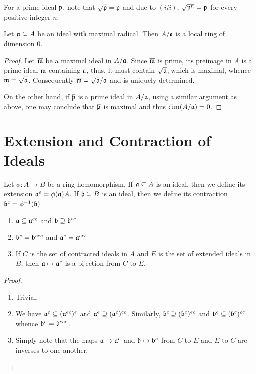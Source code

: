 For a prime ideal $\mathfrak p$, note that $\sqrt{\mathfrak p} = \mathfrak p$ and due to $(iii)$, $\sqrt{\mathfrak p^n} = \mathfrak p$ for every positive integer $n$. 

\begin{proposition}
    Let $\mathfrak a\subseteq A$ be an ideal with maximal radical. Then $A/\mathfrak a$ is a local ring of dimension $0$.
\end{proposition}
\begin{proof}
    Let $\overline{\mathfrak m}$ be a maximal ideal in $A/\mathfrak a$. Since $\overline{\mathfrak m}$ is prime, its preimage in $A$ is a prime ideal $\mathfrak m$ containing $\mathfrak a$, thus, it must contain $\sqrt{\mathfrak a}$, which is maximal, whence $\mathfrak m = \sqrt{\mathfrak a}$. Consequently $\overline{\mathfrak m} = \sqrt{\mathfrak a}/\mathfrak a$ and is uniquely determined.

    On the other hand, if $\overline{\mathfrak p}$ is a prime ideal in $A/\mathfrak a$, using a similar argument as above, one may conclude that $\overline{\mathfrak p}$ is maximal and thus $\dim(A/\mathfrak a) = 0$.
\end{proof}

\section{Extension and Contraction of Ideals}

\begin{definition}
    Let $\phi: A\to B$ be a ring homomorphism. If $\mathfrak a\subseteq A$ is an ideal, then we define its extension $\mathfrak a^e = \phi(\mathfrak a)A$. If $\mathfrak b\subseteq B$ is an ideal, then we define its contraction $\mathfrak b^c = \phi^{-1}(\mathfrak b)$.
\end{definition}

\begin{proposition}
    \begin{enumerate}[label=(\alph*)]
        \item $\mathfrak a\subseteq\mathfrak a^{ec}$ and $\mathfrak b\supseteq\mathfrak b^{ce}$ 
        \item $\mathfrak b^c = \mathfrak b^{cec}$ and $\mathfrak a^{e} = \mathfrak a^{ece}$
        \item If $C$ is the set of contracted ideals in $A$ and $E$ is the set of extended ideals in $B$, then $\mathfrak a\mapsto\mathfrak a^e$ is a bijection from $C$ to $E$.
    \end{enumerate}
\end{proposition}
\begin{proof}
\begin{enumerate}[label=(\alph*)]
    \item Trivial.
    \item We have $\mathfrak a^{e}\subseteq(\mathfrak a^{ec})^e$ and $\mathfrak a^e\supseteq(\mathfrak a^e)^{ce}$. Similarly, $\mathfrak b^c\supseteq (\mathfrak b^c)^{ec}$ and $\mathfrak b^{c}\subseteq(\mathfrak b^{c})^{ec}$ whence $\mathfrak b^c = \mathfrak b^{cec}$.
    \item Simply note that the maps $\mathfrak a\mapsto\mathfrak a^e$ and $\mathfrak b\mapsto\mathfrak b^c$ from $C$ to $E$ and $E$ to $C$ are inverses to one another.
\end{enumerate}
\end{proof}

